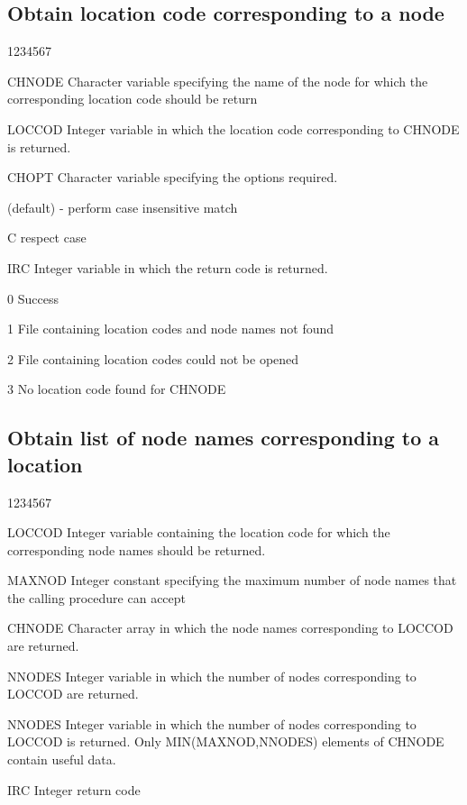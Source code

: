 \subsection{Obtain location code corresponding to a node}
\begin{DLtt}{1234567}
\item[CHNODE]
Character variable specifying the name of the node for which
the corresponding location code should be return
\item[LOCCOD]
Integer variable in which the location code corresponding to
CHNODE is returned.
\item[CHOPT]
Character variable specifying the options required.
\begin{DLtt}{12}
\item[ ](default) - perform case insensitive match
\item[C]respect case
\end{DLtt}
\item[IRC]
Integer variable in which the return code is returned.
\begin{DLtt}{12}
\item[0]Success
\item[1]File containing location codes and node names not found
\item[2]File containing location codes could not be opened
\item[3]No location code found for CHNODE
\end{DLtt}
\end{DLtt}

\subsection{Obtain list of node names corresponding to a location}
\begin{DLtt}{1234567}
\item[LOCCOD]
Integer variable containing the location code for which
the corresponding node names should be returned.
\item[MAXNOD]
Integer constant specifying the maximum number of node names
that the calling procedure can accept
\item[CHNODE]
Character array in which the node names corresponding to LOCCOD
are returned.
\item[NNODES]
Integer variable in which the number of nodes corresponding to LOCCOD
are returned.
\item[NNODES]
Integer variable in which the number of nodes corresponding to LOCCOD
is returned. Only MIN(MAXNOD,NNODES) elements of CHNODE contain
useful data.
\item[IRC]
Integer return code
\end{DLtt}

